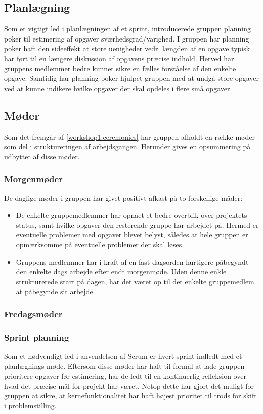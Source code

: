 \subsection{Planlægning}
Som et vigtigt led i planlægningen af et sprint, introducerede gruppen planning poker til estimering af opgaver sværhedsgrad/varighed.
I gruppen har planning poker haft den sideeffekt at store uenigheder vedr. længden af en opgave typisk har ført til en længere diskussion af opgavens præcise indhold.
Herved har gruppens medlemmer bedre kunnet sikre en fælles forståelse af den enkelte opgave.
Samtidig har planning poker hjulpet gruppen med at undgå store opgaver ved at kunne indikere hvilke opgaver der skal opdeles i flere små opgaver.

\subsection{Møder}
Som det fremgår af \cref{workshop1:ceremonies} har gruppen afholdt en række møder som del i struktureringen af arbejdsgangen.
Herunder gives en opsummering på udbyttet af disse møder.

\subsubsection{Morgenmøder}
De daglige møder i gruppen har givet positivt afkast på to forskellige måder:
\begin{itemize}
\item De enkelte gruppemedlemmer har opnået et bedre overblik over projektets status, samt hvilke opgaver den resterende gruppe har arbejdet på.
Hermed er eventuelle problemer med opgaver blevet belyst, således at hele gruppen er opmærksomme på eventuelle problemer der skal løses.

\item Gruppens medlemmer har i kraft af en fast dagsorden hurtigere påbegyndt den enkelte dags arbejde efter endt morgenmøde.
Uden denne enkle strukturerede start på dagen, har det været op til det enkelte gruppemedlem at påbegynde sit arbejde.

\end{itemize}

\subsubsection{Fredagsmøder}\label{workshop3:fredag}

\subsubsection{Sprint planning}
Som et nødvendigt led i anvendelsen af Scrum er hvert sprint indledt med et planlægnings møde.
Eftersom disse møder har haft til formål at lade gruppen prioritere opgaver før estimering, har de ledt til en kontinuerlig refleksion over hvad det præcise mål for projekt har været.
Netop dette har gjort det muligt for gruppen at sikre, at kernefunktionalitet har haft højest prioritet til trods for skift i problemstilling.

